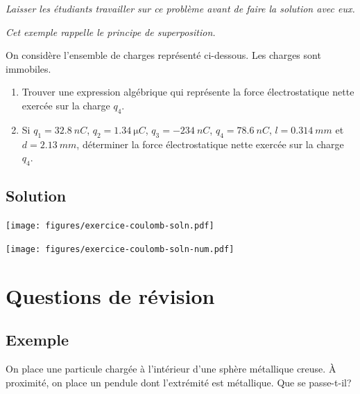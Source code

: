   \textit{Laisser les étudiants travailler sur ce problème avant de faire la
    solution avec eux.}

  \textit{Cet exemple rappelle le principe de superposition.}

  On considère l'ensemble de charges représenté ci-dessous. Les charges sont
  immobiles.

  \begin{center}
  \end{center}

  \begin{enumerate}
    \item Trouver une expression algébrique qui représente la force
      électrostatique nette exercée sur la charge $q_4$.
    \item Si $q_1 = \SI{32.8}{nC}$, $q_2 = \SI{1.34}{\micro C}$, $q_3 =
      \SI{-234}{nC}$, $q_4 = \SI{78.6}{nC}$, $l = \SI{0.314}{mm}$ et $d =
      \SI{2.13}{mm}$, déterminer la force électrostatique nette exercée sur la
      charge $q_4$.
  \end{enumerate}


\subsection*{Solution}


  \texttt{[image: figures/exercice-coulomb-soln.pdf]}

  \texttt{[image: figures/exercice-coulomb-soln-num.pdf]}


\sectionline

\section{Questions de révision}

\subsection*{Exemple}
  On place une particule chargée à l'intérieur d'une sphère métallique creuse.
  À proximité, on place un pendule dont l'extrémité est métallique. Que se
  passe-t-il?

